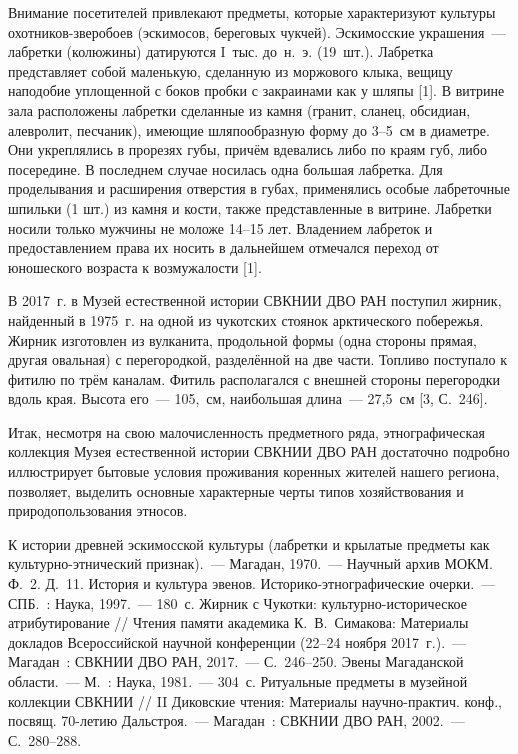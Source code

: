 Внимание посетителей привлекают предметы, которые характеризуют культуры охотников-зверобоев (эскимосов, береговых чукчей). Эскимосские украшения~--- лабретки (колюжины) датируются I~тыс. до~н.~э. (19~шт.). Лабретка представляет собой маленькую, сделанную из моржового клыка, вещицу наподобие уплощенной с боков пробки с закраинами как у шляпы [1]. В витрине зала расположены лабретки сделанные из камня (гранит, сланец, обсидиан, алевролит, песчаник), имеющие шляпообразную форму до 3--5~см в диаметре. Они укреплялись в прорезях губы, причём вдевались либо по краям губ, либо посередине. В последнем случае носилась одна большая лабретка. Для проделывания и расширения отверстия в губах, применялись особые лабреточные шпильки (1 шт.) из камня и кости, также представленные в витрине. Лабретки носили только мужчины не моложе 14--15 лет. Владением лабреток и предоставлением права их носить в дальнейшем отмечался переход от юношеского возраста к возмужалости [1].

В 2017~г. в Музей естественной истории СВКНИИ ДВО РАН поступил жирник, найденный в 1975~г. на одной из чукотских стоянок арктического побережья. Жирник изготовлен из вулканита, продольной формы (одна стороны прямая, другая овальная) с перегородкой, разделённой на две части. Топливо поступало к фитилю по трём каналам. Фитиль располагался с внешней стороны перегородки вдоль края. Высота его~--- 105,~см, наибольшая длина~--- 27,5~см [3, С.~246].

Итак, несмотря на свою малочисленность предметного ряда, этнографическая коллекция Музея естественной истории СВКНИИ ДВО РАН достаточно подробно иллюстрирует бытовые условия проживания коренных жителей нашего региона, позволяет, выделить основные характерные черты типов хозяйствования и природопользования этносов.

\begin{thebibliography}{99}
\bibitem{} К истории древней эскимосской культуры (лабретки и крылатые предметы как культурно-этнический признак).~--- Магадан, 1970.~--- Научный архив МОКМ. Ф.~2. Д.~11.
\bibitem{}История и культура эвенов. Историко-этнографические очерки.~--- СПБ.~: Наука, 1997.~--- 180~с.
\bibitem{} Жирник с Чукотки: культурно-историческое атрибутирование // Чтения памяти академика К.~В.~Симакова: Материалы докладов Всероссийской научной конференции (22--24 ноября 2017~г.).~--- Магадан~: СВКНИИ ДВО РАН, 2017.~--- С.~246--250.
\bibitem{} Эвены Магаданской области.~--- М.~: Наука, 1981.~--- 304~с.
\bibitem{} Ритуальные предметы в музейной коллекции СВКНИИ // II Диковские чтения: Материалы научно-практич. конф., посвящ. 70-летию Дальстроя.~--- Магадан~: СВКНИИ ДВО РАН, 2002.~--- С.~280--288.

\end{thebibliography}
